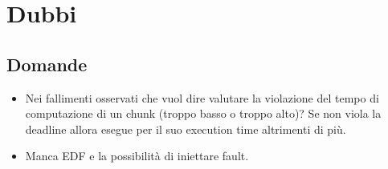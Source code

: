 \chapter{Dubbi}

\section{Domande}
\begin{itemize}
    \item  Nei fallimenti osservati che vuol dire valutare la violazione del tempo di computazione di un chunk (troppo basso o troppo alto)? Se non viola la deadline allora esegue per il suo execution time altrimenti di più.
    \item Manca EDF e la possibilità di iniettare fault.
\end{itemize}